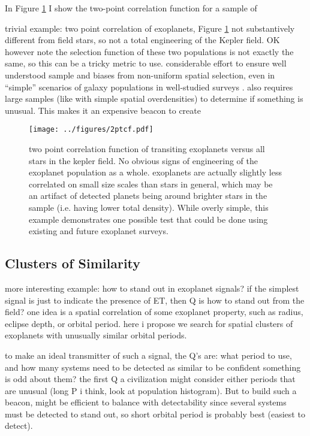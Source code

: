 \documentclass[twocolumn]{aastex62}
\begin{document}
In Figure \ref{fig:2pt} I show the two-point correlation function for a sample of 

trivial example: two point correlation of exoplanets, Figure \ref{fig:2pt}
 not substantively different from field stars, so not a total engineering of the Kepler field. OK however note the selection function of these two populations is not exactly the same, so this can be a tricky metric to  use. considerable effort to ensure well understood sample and biases from non-uniform spatial selection, even in ``simple'' scenarios of galaxy populations in well-studied surveys \citep[e.g.][]{wang2013}. also requires large samples (like with simple spatial overdensities) to determine if something is unusual. This makes it an expensive beacon to create


\begin{figure}[!t]
\centering
\texttt{[image: ../figures/2ptcf.pdf]}
\caption{two point correlation function of transiting exoplanets versus all stars in the kepler field. No obvious signs of engineering of the exoplanet population as a whole. exoplanets are actually slightly less correlated on small size scales than stars in general, which may be an artifact of detected planets being around brighter stars in the sample (i.e. having lower total density). 
While overly simple, this example demonstrates one possible test that could be done using existing and future exoplanet surveys.}
\label{fig:2pt}
\end{figure}


\subsection{Clusters of Similarity}
more interesting example: how to stand out in exoplanet signals? if the simplest signal is just to indicate the presence of ET, then Q is how to stand out from the field? one idea is a spatial correlation of some exoplanet property, such as radius, eclipse depth, or orbital period. here i propose we search for spatial clusters of exoplanets with unusually similar orbital periods.

to make an ideal transmitter of such a signal, the Q's are: what period to use, and how many systems need to be detected as similar to be confident something is odd about them? the first Q a civilization might consider either periods that are unusual (long P i think, look at population histogram). But to build such a beacon, might be efficient to balance with detectability since several systems must be detected to stand out, so short orbital period is probably best (easiest to detect). 
\end{document}

